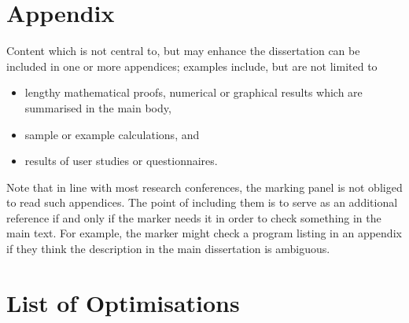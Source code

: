 \documentclass[ oneside,tikz,%
                    author={Joshua Felmeden},
                    degree={MEng},
                     title={Semantic Analysis of Financial Headlines Based on Realised Stock Returns},
                  subtitle={Research}]{dissertation}
\begin{document}








\backmatter





\appendix

% 
\chapter{Appendix}
\label{appx}

Content which is not central to, but may enhance the dissertation can be 
included in one or more appendices; examples include, but are not limited
to

\begin{itemize}
\item lengthy mathematical proofs, numerical or graphical results which 
      are summarised in the main body,
\item sample or example calculations, 
      and
\item results of user studies or questionnaires.
\end{itemize}

\noindent
Note that in line with most research conferences, the marking panel is not
obliged to read such appendices. The point of including them is to serve as
an additional reference if and only if the marker needs it in order to check
something in the main text. For example, the marker might check a program listing 
in an appendix if they think the description in the main dissertation is ambiguous.

\chapter{List of Optimisations}
\end{document}
